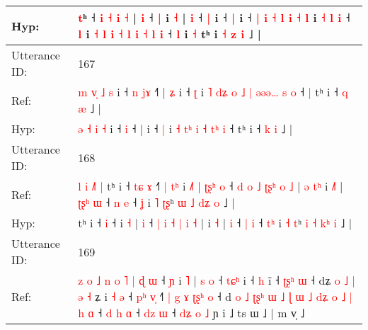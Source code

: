 \documentclass[10pt]{article}
\DeclareRobustCommand{\hl}[1]{{\textcolor{red}{#1}}}
\begin{document}
\begin{longtable}{ll}
 \\
Hyp: & \hl{}\hl{t}ʰ\hl{}\hl{} ˧\hl{}\hl{}\hl{}\hl{} \hl{i} \hl{}\hl{}\hl{˧} \hl{i} \hl{˧} |\hl{}\hl{} \hl{i} ˧ \hl{|} i \hl{˧} |\hl{}\hl{} \hl{i} ˧ \hl{}\hl{}\hl{|} i ˧ \hl{|} i\hl{} ˧\hl{}\hl{}\hl{}\hl{} \hl{|} \hl{i} \hl{}\hl{˧} \hl{l} \hl{i} \hl{˧} \hl{}\hl{l} i\hl{}\hl{}\hl{} \hl{˧} \hl{l} \hl{i} ˧ \hl{}\hl{}\hl{l} i\hl{}\hl{} \hl{}\hl{˧} \hl{l} \hl{i} \hl{˧} \hl{l} \hl{i} \hl{˧} \hl{l} \hl{i} ˧ \hl{l} i \hl{˧} tʰ i \hl{˧} \hl{}\hl{}\hl{z} \hl{i} ˩ |
 \\
\midrule
Utterance ID: & 167 \\
Ref: & \hl{m} \hl{v}\hl{̩} \hl{˩} \hl{s} i ˧\hl{ }\hl{n} \hl{j}\hl{ɤ} ˧\hl{˥} |\hl{ }\hl{ʑ} i ˧ \hl{ʈ} i \hl{˥} \hl{d}\hl{ʑ}\hl{ }\hl{o} \hl{˩} \hl{|} \hl{ə}\hl{ə}\hl{ə}\hl{…}\hl{ }\hl{s} \hl{o} ˧\hl{ }\hl{|} tʰ i ˧ \hl{q} \hl{æ} ˩ |
 \\
Hyp: & \hl{ə} \hl{}\hl{˧} \hl{i} \hl{˧} i ˧\hl{}\hl{} \hl{}\hl{i} ˧\hl{} |\hl{}\hl{} i ˧ \hl{|} i \hl{˧} \hl{}\hl{}\hl{t}\hl{ʰ} \hl{i} \hl{˧} \hl{}\hl{}\hl{}\hl{}\hl{t}\hl{ʰ} \hl{i} ˧\hl{}\hl{} tʰ i ˧ \hl{k} \hl{i} ˩ |
 \\
\midrule
Utterance ID: & 168 \\
Ref: & \hl{l}\hl{ }\hl{i}\hl{ }\hl{˩}\hl{˥}\hl{ }\hl{|}\hl{ }tʰ i ˧\hl{ }\hl{t}\hl{ɕ} \hl{ɤ} ˧\hl{˥}\hl{ }\hl{|}\hl{ }\hl{t}\hl{ʰ} i \hl{˩}\hl{˥} |\hl{ }\hl{ʈ}\hl{ʂ}\hl{ʰ} \hl{o} ˧ \hl{d} \hl{o} \hl{˩} \hl{ʈ}\hl{ʂ}\hl{ʰ} \hl{o} \hl{˩} |\hl{ }\hl{ə}\hl{ }\hl{t}\hl{ʰ} i \hl{˩}\hl{˥} |\hl{ }\hl{ʈ}\hl{ʂ}\hl{ʰ} \hl{ɯ} ˧ \hl{n} \hl{e} ˧ \hl{}\hl{ʝ} i \hl{˥} \hl{ʈ}\hl{ʂ}ʰ \hl{ɯ} \hl{˩} \hl{d}\hl{ʑ} \hl{o} ˩ |
 \\
Hyp: & \hl{}\hl{}\hl{}\hl{}\hl{}\hl{}\hl{}\hl{}\hl{}tʰ i ˧\hl{}\hl{}\hl{} \hl{i} ˧\hl{}\hl{}\hl{}\hl{}\hl{}\hl{} i \hl{}\hl{˧} |\hl{}\hl{}\hl{}\hl{} \hl{i} ˧ \hl{|} \hl{i} \hl{˧} \hl{}\hl{}\hl{|} \hl{i} \hl{˧} |\hl{}\hl{}\hl{}\hl{}\hl{} i \hl{}\hl{˧} |\hl{}\hl{}\hl{}\hl{} \hl{i} ˧ \hl{|} \hl{i} ˧ \hl{t}\hl{ʰ} i \hl{˧} \hl{}\hl{t}ʰ \hl{i} \hl{˧} \hl{k}\hl{ʰ} \hl{i} ˩ |
 \\
\midrule
Utterance ID: & 169 \\
Ref: & \hl{z}\hl{ }\hl{o}\hl{ }\hl{˩}\hl{ }\hl{n}\hl{ }\hl{o} \hl{˥} \hl{|} \hl{ɖ} \hl{ɯ} ˧ \hl{ɲ} i \hl{˥} |\hl{ }\hl{s} \hl{o} ˧ \hl{t}\hl{ɕ}\hl{ʰ} i ˧ \hl{}\hl{h} i\hl{̃} ˧ \hl{ʈ}\hl{ʂ}\hl{ʰ} \hl{ɯ} ˧ dʑ\hl{ }\hl{o}\hl{ }\hl{˩} \hl{|} \hl{ə} \hl{˧}\hl{ }ʑ i\hl{ }\hl{˧}\hl{ }\hl{ə} ˧ \hl{p}\hl{ʰ} \hl{v}\hl{̩} ˧\hl{˥}\hl{ }\hl{|}\hl{ }\hl{g}\hl{ }\hl{ɤ} \hl{ʈ}\hl{ʂ}\hl{ʰ} \hl{o} ˧ d\hl{ }\hl{o} \hl{˩} \hl{ʈ}\hl{ʂ}\hl{ʰ} \hl{ɯ} \hl{˩} \hl{ɭ} \hl{ɯ} \hl{˩} \hl{d}\hl{ʑ} \hl{o} \hl{˩} \hl{|} \hl{h} \hl{ɑ} ˧\hl{ }\hl{d} \hl{h} \hl{ɑ} ˧ \hl{d}\hl{z} \hl{ɯ} ˧ \hl{d}\hl{ʑ} \hl{o} \hl{˩} ɲ i ˩ ts ɯ ˩ | m v̩ ˩\hl{}\hl{}

\end{longtable}
\end{document}

